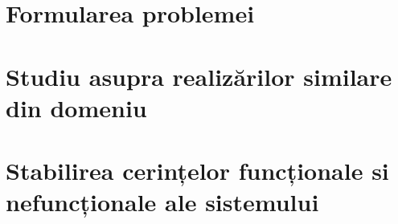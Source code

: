 \section {Formularea problemei}


\section {Studiu asupra realizărilor similare din domeniu}

\section {Stabilirea cerințelor funcționale si nefuncționale ale sistemului}


